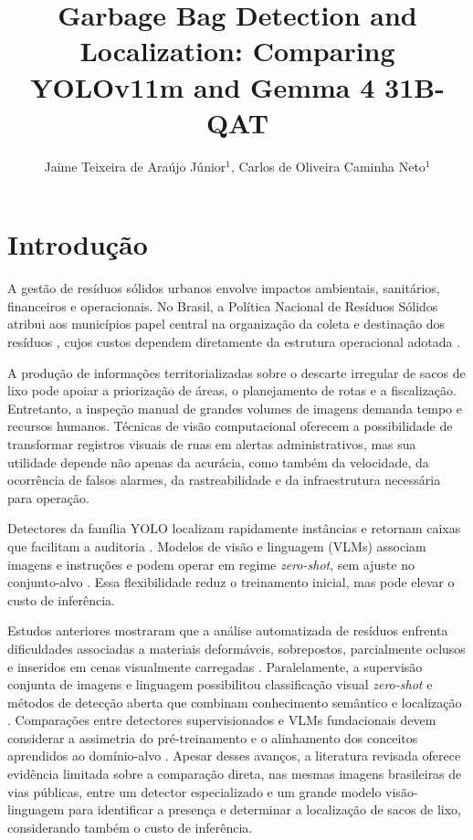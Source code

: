 \documentclass[kdmile,a4paper]{kdmile}
\title{Garbage Bag Detection and Localization: Comparing YOLOv11m and Gemma 4 31B-QAT}
\author{Jaime Teixeira de Araújo Júnior$^{1}$, Carlos de Oliveira Caminha Neto$^{1}$}
\institute{$^{1}$ Universidade Federal do Ceará (UFC)\\
Fortaleza, CE, Brasil\\
\texttt{jaimejrs@alu.ufc.br, caminha@ufc.br}}
\begin{document}
\begin{bottomstuff}
\end{bottomstuff}

\maketitle

\section{Introdução}
\label{sec:introducao}

A gestão de resíduos sólidos urbanos envolve impactos ambientais, sanitários, financeiros e operacionais. No Brasil, a Política Nacional de Resíduos Sólidos atribui aos municípios papel central na organização da coleta e destinação dos resíduos \cite{Brasil2010}, cujos custos dependem diretamente da estrutura operacional adotada \cite{Rodrigues2016}.

A produção de informações territorializadas sobre o descarte irregular de sacos de lixo pode apoiar a priorização de áreas, o planejamento de rotas e a fiscalização. Entretanto, a inspeção manual de grandes volumes de imagens demanda tempo e recursos humanos. Técnicas de visão computacional oferecem a possibilidade de transformar registros visuais de ruas em alertas administrativos, mas sua utilidade depende não apenas da acurácia, como também da velocidade, da ocorrência de falsos alarmes, da rastreabilidade e da infraestrutura necessária para operação.

Detectores da família YOLO localizam rapidamente instâncias e retornam caixas que facilitam a auditoria \cite{Redmon2016YOLO,Ultralytics2024YOLO11}. Modelos de visão e linguagem (VLMs) associam imagens e instruções e podem operar em regime \emph{zero-shot}, sem ajuste no conjunto-alvo \cite{Radford2021CLIP}. Essa flexibilidade reduz o treinamento inicial, mas pode elevar o custo de inferência.

Estudos anteriores mostraram que a análise automatizada de resíduos enfrenta dificuldades associadas a materiais deformáveis, sobrepostos, parcialmente oclusos e inseridos em cenas visualmente carregadas \cite{Bashkirova2022ZeroWaste,Abid2025WasteDetection}. Paralelamente, a supervisão conjunta de imagens e linguagem possibilitou classificação visual \emph{zero-shot} \cite{Radford2021CLIP} e métodos de detecção aberta que combinam conhecimento semântico e localização \cite{Kuo2023FVLM,Jin2024FineGrainedDescriptors}. Comparações entre detectores supervisionados e VLMs fundacionais devem considerar a assimetria do pré-treinamento e o alinhamento dos conceitos aprendidos ao domínio-alvo \cite{Madan2024FewShotVLM}. Apesar desses avanços, a literatura revisada oferece evidência limitada sobre a comparação direta, nas mesmas imagens brasileiras de vias públicas, entre um detector especializado e um grande modelo visão-linguagem para identificar a presença e determinar a localização de sacos de lixo, considerando também o custo de inferência.
\end{document}
